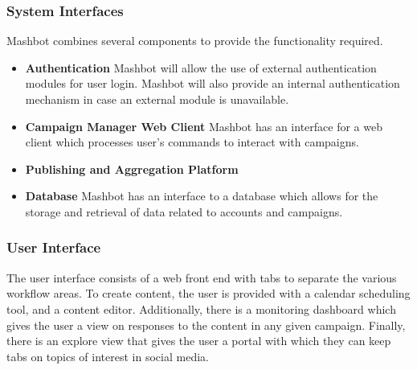 \documentclass{report}
\begin{document}
		\subsubsection{System Interfaces} %
			Mashbot combines several components to provide the functionality
			required.
			\begin{itemize}
				\item \textbf{Authentication} Mashbot
                                  will allow the use of external
                                  authentication modules for user
                                  login. Mashbot will also provide an
                                  internal authentication mechanism
                                  in case an external module is
                                  unavailable.
				\item \textbf{Campaign Manager Web
                                  Client} Mashbot has an interface for
                                  a web client which processes user's
                                  commands to interact with campaigns.
				\item \textbf{Publishing and Aggregation
                                  Platform}
				\item \textbf{Database} Mashbot has an
                                  interface to a database which allows
                                  for the storage and retrieval of
                                  data related to accounts and campaigns.
			\end{itemize}
		\subsubsection{User Interface} %
                The user interface consists of a web front end
                with tabs to separate the various workflow areas. To
                create content, the user is provided with a calendar
                scheduling tool, and a content editor.  Additionally,
                there is a monitoring dashboard which gives the user a
                view on responses to the content in any given campaign.
                Finally, there is an explore view that gives the user a
                portal with which they can keep tabs on topics of 
                interest in social media.
\end{document}
